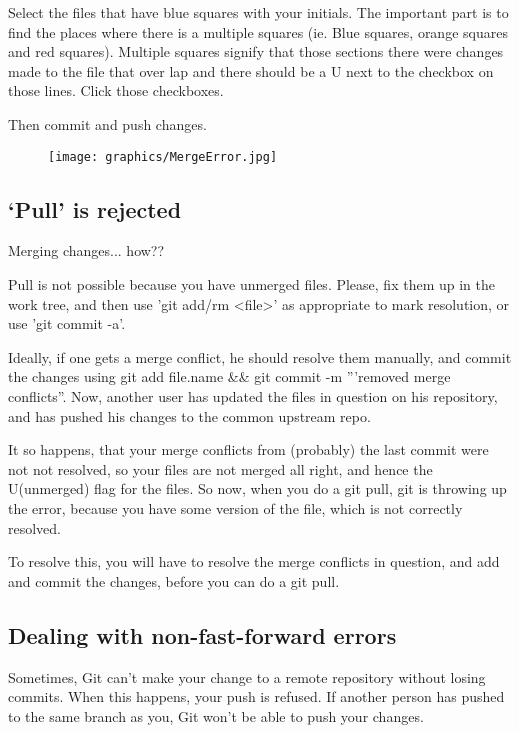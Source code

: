 \documentclass[12pt]{../SOP4_alpha}\usepackage[]{graphicx}\usepackage[]{xcolor}
\begin{document}
\NP Select the files that have blue squares with your initials. The important part is to find the places where there is a multiple squares (ie. Blue squares, orange squares and red squares). Multiple squares signify that those sections there were changes made to the file that over lap and there should be a U next to the checkbox on those lines. Click those checkboxes. 

\NP Then commit and push changes. 

\begin{figure}
\centering
\texttt{[image: graphics/MergeError.jpg]}
\end{figure}

\subsection{`Pull' is rejected}

\NP Merging changes... how??

Pull is not possible because you have unmerged files.
Please, fix them up in the work tree, and then use 'git add/rm <file>'
as appropriate to mark resolution, or use 'git commit -a'.

Ideally, if one gets a merge conflict, he should resolve them manually, and commit the changes using git add file.name \&\& git commit -m '''removed merge conflicts''. Now, another user has updated the files in question on his repository, and has pushed his changes to the common upstream repo.

It so happens, that your merge conflicts from (probably) the last commit were not not resolved, so your files are not merged all right, and hence the U(unmerged) flag for the files. So now, when you do a git pull, git is throwing up the error, because you have some version of the file, which is not correctly resolved.

To resolve this, you will have to resolve the merge conflicts in question, and add and commit the changes, before you can do a git pull.

\subsection{Dealing with non-fast-forward errors}

\NP Sometimes, Git can't make your change to a remote repository without losing commits. When this happens, your push is refused. If another person has pushed to the same branch as you, Git won't be able to push your changes.
\end{document}
